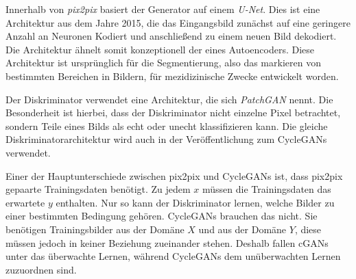 Innerhalb von \emph{pix2pix} basiert der Generator auf einem \emph{U-Net}. Dies ist eine Architektur aus dem Jahre 2015, die das Eingangsbild zunächst auf eine geringere Anzahl an Neuronen Kodiert und anschließend zu einem neuen Bild dekodiert. Die Architektur ähnelt somit konzeptionell der eines Autoencoders. Diese Architektur ist ursprünglich für die Segmentierung, also das markieren von bestimmten Bereichen in Bildern, für mezidizinische Zwecke entwickelt worden. \cite{unet} \cite{pix2pix}

Der Diskriminator verwendet eine Architektur, die sich \emph{PatchGAN} nennt. Die Besonderheit ist hierbei, dass der Diskriminator nicht einzelne Pixel betrachtet, sondern Teile eines Bilds als echt oder unecht klassifizieren kann. Die gleiche Diskriminatorarchitektur wird auch in der Veröffentlichung zum \acp{CycleGAN} verwendet. \cite{pix2pix} \cite{cycleGAN}

Einer der Hauptunterschiede zwischen pix2pix und \acp{CycleGAN} ist, dass pix2pix gepaarte Trainingsdaten benötigt. Zu jedem $x$ müssen die Trainingsdaten das erwartete $y$ enthalten. Nur so kann der Diskriminator lernen, welche Bilder zu einer bestimmten Bedingung gehören. \acp{CycleGAN} brauchen das nicht. Sie benötigen Trainingsbilder aus der Domäne $X$ und aus der Domäne $Y$, diese müssen jedoch in keiner Beziehung zueinander stehen. Deshalb fallen \acp{cGAN} unter das überwachte Lernen, während \acp{CycleGAN} dem unüberwachten Lernen zuzuordnen sind. \cite{pix2pix} \cite{cycleGAN}




